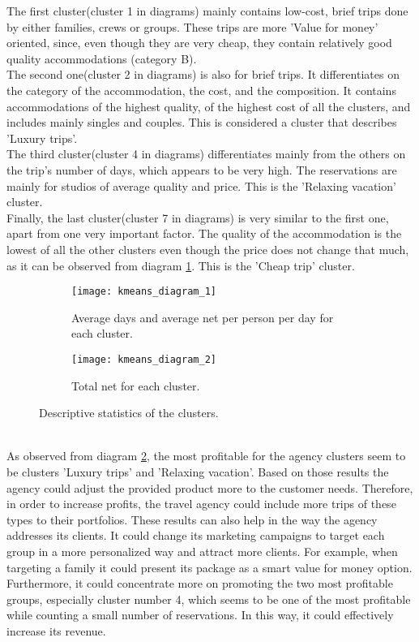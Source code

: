 The first cluster(cluster 1 in diagrams) mainly contains low-cost, brief trips done by either families, crews or groups. These trips are more 'Value for money' oriented, since, even though they are very cheap, they contain relatively good quality accommodations (category B). \\
The second one(cluster 2 in diagrams) is also for brief trips. It differentiates on the category of the accommodation, the cost, and the composition. It contains accommodations of the highest quality, of the highest cost of all the clusters, and includes mainly singles and couples. This is considered a cluster that describes 'Luxury trips'. \\
The third cluster(cluster 4 in diagrams) differentiates mainly from the others on the trip's number of days, which appears to be very high. The reservations are mainly for studios of average quality and price. This is the 'Relaxing vacation' cluster. \\
Finally, the last cluster(cluster 7 in diagrams) is very similar to the first one, apart from one very important factor. The quality of the accommodation is the lowest of all the other clusters even though the price does not change that much, as it can be observed from diagram \ref{fig:kmeans1}. This is the 'Cheap trip' cluster.
\begin{figure}[ht]
\centering
\begin{subfigure}{.5\textwidth}
\centering
\texttt{[image: kmeans\_diagram\_1]}
\caption{Average days and average net per person per day for each cluster.}
\label{fig:kmeans1}
\end{subfigure}%
\begin{subfigure}{.5\textwidth}
\centering
\texttt{[image: kmeans\_diagram\_2]}
\caption{Total net for each cluster.}
\label{fig:kmeans2}
\end{subfigure}%
\caption{Descriptive statistics of the clusters.}
\label{fig:kmeans_descriptives}
\end{figure}
\\
As observed from diagram \ref{fig:kmeans2}, the most profitable for the agency clusters seem to be clusters 'Luxury trips' and 'Relaxing vacation'. Based on those results the agency could adjust the provided product more to the customer needs. Therefore, in order to increase profits, the travel agency could include more trips of these types to their portfolios. These results can also help in the way the agency addresses its clients. It could change its marketing campaigns to target each group in a more personalized way and attract more clients. For example, when targeting a family it could present its package as a smart value for money option. Furthermore, it could concentrate more on promoting the two most profitable groups, especially cluster number 4, which seems to be one of the most profitable while counting a small number of reservations. In this way, it could effectively increase its revenue. \\

